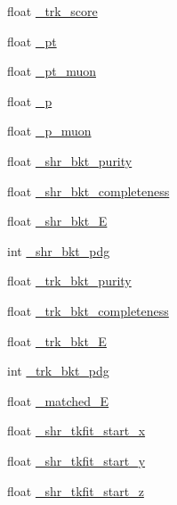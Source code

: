 \begin{DoxyCompactItemize}
\item 
float \hyperlink{classselection_1_1NuMuSelection_a2316596a59c6b87ea5aa75716c588117}{\-\_\-trk\-\_\-score}
\item 
float \hyperlink{classselection_1_1NuMuSelection_aab5bb47332ae2489a5ab96078397d075}{\-\_\-pt}
\item 
float \hyperlink{classselection_1_1NuMuSelection_abcba7cd55395fa3ae3822f84abad4d73}{\-\_\-pt\-\_\-muon}
\item 
float \hyperlink{classselection_1_1NuMuSelection_a821979901c138eca118246a1eeedcd80}{\-\_\-p}
\item 
float \hyperlink{classselection_1_1NuMuSelection_a94f9c7445dc565e03c899633f031250d}{\-\_\-p\-\_\-muon}
\item 
float \hyperlink{classselection_1_1NuMuSelection_a6988cb9e869c0205f44659b3a65bd047}{\-\_\-shr\-\_\-bkt\-\_\-purity}
\item 
float \hyperlink{classselection_1_1NuMuSelection_a18224668e51654b8322757c2db5d8b9d}{\-\_\-shr\-\_\-bkt\-\_\-completeness}
\item 
float \hyperlink{classselection_1_1NuMuSelection_aa6e475979c9554cb14bf7a082385a128}{\-\_\-shr\-\_\-bkt\-\_\-\-E}
\item 
int \hyperlink{classselection_1_1NuMuSelection_ab5695d0d13afa6fe27e38b63951ade58}{\-\_\-shr\-\_\-bkt\-\_\-pdg}
\item 
float \hyperlink{classselection_1_1NuMuSelection_a72c22e0de99d58873fa4e9824e094c50}{\-\_\-trk\-\_\-bkt\-\_\-purity}
\item 
float \hyperlink{classselection_1_1NuMuSelection_a569e5b1199f57a2becbd28ee0202baae}{\-\_\-trk\-\_\-bkt\-\_\-completeness}
\item 
float \hyperlink{classselection_1_1NuMuSelection_a1957763f4a43de544b42a9e04cf83afa}{\-\_\-trk\-\_\-bkt\-\_\-\-E}
\item 
int \hyperlink{classselection_1_1NuMuSelection_afc6475990e683ff735846740580cac9b}{\-\_\-trk\-\_\-bkt\-\_\-pdg}
\item 
float \hyperlink{classselection_1_1NuMuSelection_a47c185ab6ea19a597c0d049359e851e1}{\-\_\-matched\-\_\-\-E}
\item 
float \hyperlink{classselection_1_1NuMuSelection_a2e7f6e41acd96cb4ff217b1ec129884e}{\-\_\-shr\-\_\-tkfit\-\_\-start\-\_\-x}
\item 
float \hyperlink{classselection_1_1NuMuSelection_aced5ceef2d92e448cfed37ec3fb75ab4}{\-\_\-shr\-\_\-tkfit\-\_\-start\-\_\-y}
\item 
float \hyperlink{classselection_1_1NuMuSelection_a82f756e0a512e9b2ab45a0d2061d2ec3}{\-\_\-shr\-\_\-tkfit\-\_\-start\-\_\-z}

\end{DoxyCompactItemize}
